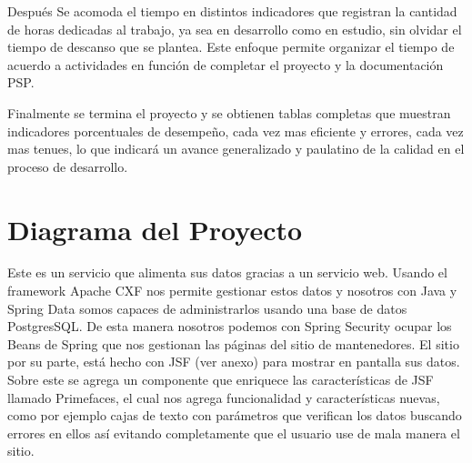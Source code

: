 \documentclass[a4paper,12pt,openany,oneside]{book}
\begin{document}
Después Se acomoda el tiempo en distintos indicadores que registran la cantidad de horas dedicadas al trabajo, ya sea en desarrollo como en estudio, sin olvidar el tiempo de descanso que se plantea. Este enfoque permite organizar el tiempo de acuerdo a actividades en función de completar el proyecto y la documentación PSP.

Finalmente se termina el proyecto y se obtienen tablas completas que muestran indicadores porcentuales de desempeño, cada vez mas eficiente y errores, cada vez mas tenues, lo que indicará un avance generalizado y paulatino de la calidad en el proceso de desarrollo.
\section{Diagrama del Proyecto}
Este es un servicio que alimenta sus datos gracias a un servicio web. Usando el framework Apache CXF nos permite gestionar estos datos y nosotros con Java y Spring Data somos capaces de administrarlos usando una base de datos PostgresSQL. De esta manera nosotros podemos con Spring Security ocupar los Beans de Spring que nos gestionan las páginas del sitio de mantenedores. El sitio por su parte, está hecho con JSF (ver anexo) para mostrar en pantalla sus datos. Sobre este se agrega un componente que enriquece las características de JSF llamado Primefaces, el cual nos agrega funcionalidad y características nuevas, como por ejemplo cajas de texto con parámetros que verifican los datos buscando errores en ellos así evitando completamente que el usuario use de mala manera el sitio.
\end{document}
